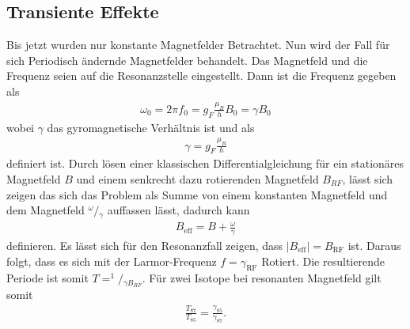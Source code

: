 \subsection{Transiente Effekte}
Bis jetzt wurden nur konstante Magnetfelder Betrachtet.
Nun wird der Fall für sich Periodisch ändernde Magnetfelder behandelt.
Das Magnetfeld und die Frequenz seien auf die Resonanzstelle eingestellt.
Dann ist die Frequenz gegeben als 
\begin{align}
	\omega_0=2\pi f_0=g_F\frac{\mu_B}{h}B_0=\gamma B_0
\end{align}
wobei $\gamma$ das gyromagnetische Verhältnis ist und als 
\begin{align}
	\gamma=g_F\frac{\mu_B}{h}
\end{align}
definiert ist.
Durch lösen einer klassischen Differentialgleichung für ein stationäres Magnetfeld $B$ und einem senkrecht dazu rotierenden Magnetfeld $B_{RF}$, lässt sich zeigen das sich das Problem als Summe von einem konstanten Magnetfeld und dem Magnetfeld ${}^\omega\!/\!_\gamma$ auffassen lässt, dadurch kann
\begin{align}
	B_\text{eff}=B+\frac{\omega}{\gamma}
\end{align}
definieren.
Es lässt sich für den Resonanzfall zeigen, dass $|B_\text{eff}| =B_\text{RF}$ ist.
Daraus folgt, dass es sich mit der Larmor-Frequenz $f=\gamma_\text{RF}$ Rotiert.
Die resultierende Periode ist somit $T=^1 \!\! /\!_{\gamma B_{RF}}$.
Für zwei Isotope bei resonanten Magnetfeld gilt somit
\begin{align}
	\frac{T_{87}}{T_{85}}=\frac{\gamma_{85}}{\gamma_{87}}.
\end{align}